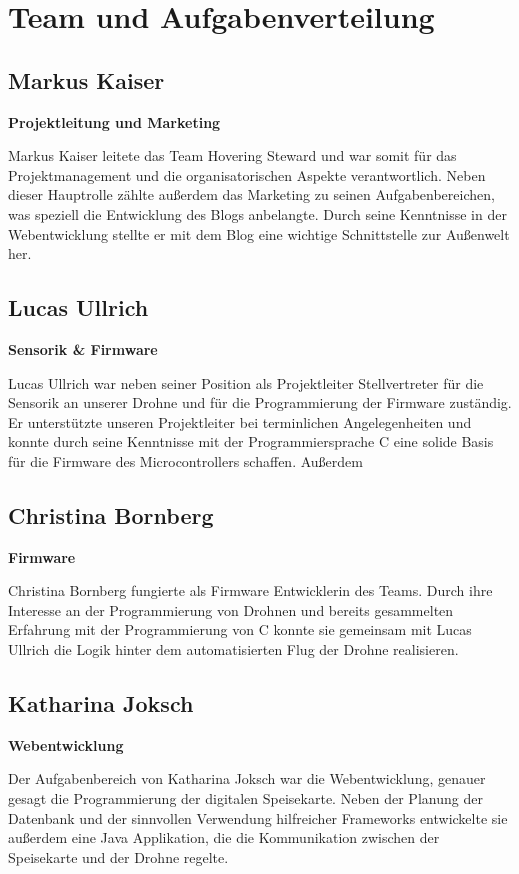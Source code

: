 \section{Team und Aufgabenverteilung}
  \subsection*{Markus Kaiser}
  \textbf{Projektleitung und Marketing}

  Markus Kaiser leitete das Team Hovering Steward und war somit für das Projektmanagement und
  die organisatorischen Aspekte verantwortlich. Neben dieser Hauptrolle zählte außerdem das Marketing
  zu seinen Aufgabenbereichen, was speziell die Entwicklung des Blogs anbelangte. Durch seine Kenntnisse
  in der Webentwicklung stellte er mit dem Blog eine wichtige Schnittstelle zur Außenwelt her.

  \subsection*{Lucas Ullrich}
  \textbf{Sensorik \& Firmware}

  Lucas Ullrich war neben seiner Position als Projektleiter Stellvertreter für die Sensorik an unserer Drohne und
  für die Programmierung der Firmware zuständig. Er unterstützte unseren Projektleiter bei terminlichen Angelegenheiten
  und konnte durch seine Kenntnisse mit der Programmiersprache C eine solide Basis für die Firmware des Microcontrollers schaffen.
  Außerdem

  \subsection*{Christina Bornberg}
  \textbf{Firmware}

  Christina Bornberg fungierte als Firmware Entwicklerin des Teams. Durch ihre Interesse an der Programmierung von Drohnen
  und bereits gesammelten Erfahrung mit der Programmierung von C konnte sie gemeinsam mit Lucas Ullrich die Logik hinter
  dem automatisierten Flug der Drohne realisieren.

  \subsection*{Katharina Joksch}
  \textbf{Webentwicklung}

  Der Aufgabenbereich von Katharina Joksch war die Webentwicklung, genauer gesagt die Programmierung der digitalen Speisekarte.
  Neben der Planung der Datenbank und der sinnvollen Verwendung hilfreicher Frameworks entwickelte sie außerdem eine Java Applikation,
  die die Kommunikation zwischen der Speisekarte und der Drohne regelte.

